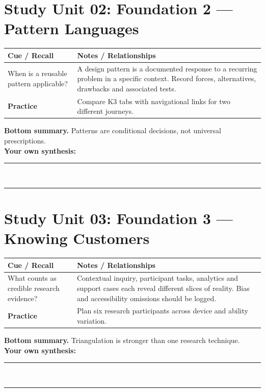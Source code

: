 \documentclass[11pt]{article}
\begin{document}
\section{Study Unit 02: Foundation 2 — Pattern Languages}
\begin{longtable}{@{}p{.27\linewidth}p{.66\linewidth}@{}}\toprule
\textbf{Cue / Recall} & \textbf{Notes / Relationships}\\\midrule\endhead
When is a reusable pattern applicable? & A design pattern is a documented response to a recurring problem in a specific context. Record forces, alternatives, drawbacks and associated tests.\\
\addlinespace[4mm]
\textbf{Practice} & Compare K3 tabs with navigational links for two different journeys.\\\bottomrule\end{longtable}
\begin{dosnotebox}\textbf{Bottom summary.} Patterns are conditional decisions, not universal prescriptions.\\[2mm]
\textbf{Your own synthesis:} \rule{.72\linewidth}{.4pt}\\[4mm]
\rule{.96\linewidth}{.4pt}\end{dosnotebox}

\section{Study Unit 03: Foundation 3 — Knowing Customers}
\begin{longtable}{@{}p{.27\linewidth}p{.66\linewidth}@{}}\toprule
\textbf{Cue / Recall} & \textbf{Notes / Relationships}\\\midrule\endhead
What counts as credible research evidence? & Contextual inquiry, participant tasks, analytics and support cases each reveal different slices of reality. Bias and accessibility omissions should be logged.\\
\addlinespace[4mm]
\textbf{Practice} & Plan six research participants across device and ability variation.\\\bottomrule\end{longtable}
\begin{dosnotebox}\textbf{Bottom summary.} Triangulation is stronger than one research technique.\\[2mm]
\textbf{Your own synthesis:} \rule{.72\linewidth}{.4pt}\\[4mm]
\rule{.96\linewidth}{.4pt}\end{dosnotebox}
\end{document}
